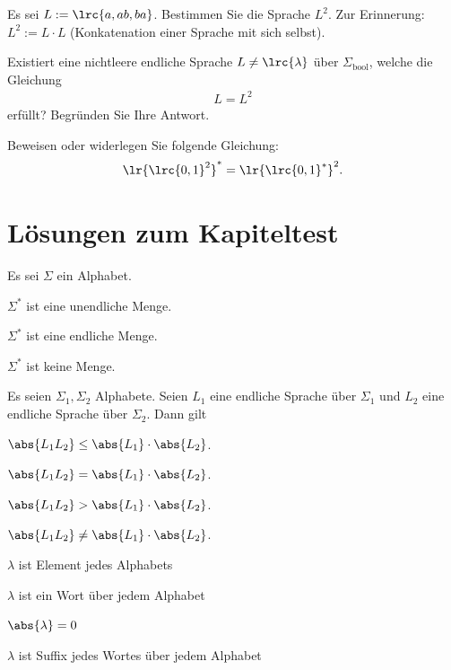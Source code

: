 \begin{myexercise}\label{myexercise:kp02}
	\begin{aenum}
		\item Es sei $L := \lrc{a, ab, ba}$. Bestimmen Sie die Sprache $L^2$. Zur Erinnerung: $L^2 := L\cdot L$ (Konkatenation einer Sprache mit sich selbst).
		\item Existiert eine nichtleere endliche Sprache $L\neq\lrc{\lambda}$ über $\Sigma_{\text{bool}}$, welche die Gleichung
		\begin{align*}
			L = L^2
		\end{align*}
		erfüllt? Begründen Sie Ihre Antwort.
	\end{aenum}
\end{myexercise}

\begin{myexercise}\label{myexercise:kp03}
	Beweisen oder widerlegen Sie folgende Gleichung:
	\begin{align*}
		\lr{\lrc{0, 1}^2}^* = \lr{\lrc{0, 1}^*}^2.
	\end{align*}
\end{myexercise}

\clearpage
\section{Lösungen zum Kapiteltest}
\shipoutAnswer
\begin{myanswer}[myexercise:kp00]
	\begin{aenum}
		\item Es sei $\Sigma$ ein Alphabet.
		\begin{todolist}
			\item[\done] $\Sigma^*$ ist eine unendliche Menge.
			\item $\Sigma^*$ ist eine endliche Menge.
			\item $\Sigma^*$ ist keine Menge.
		\end{todolist}
		\item Es seien $\Sigma_1, \Sigma_2$ Alphabete. Seien $L_1$ eine endliche Sprache über $\Sigma_1$ und $L_2$ eine endliche Sprache über $\Sigma_2$. Dann gilt
		\begin{todolist}
			\item[\done] $\abs{L_1L_2} \leq \abs{L_1}\cdot \abs{L_2}$.
			\item $\abs{L_1L_2} = \abs{L_1}\cdot \abs{L_2}$.
			\item $\abs{L_1L_2} > \abs{L_1}\cdot \abs{L_2}$.
			\item $\abs{L_1L_2} \neq \abs{L_1}\cdot \abs{L_2}$.
		\end{todolist}
		\item
		\begin{todolist}
			\item $\lambda$ ist Element jedes Alphabets
			\item[\done] $\lambda$ ist ein Wort über jedem Alphabet
			\item[\done] $\abs{\lambda} = 0$
			\item[\done] $\lambda$ ist Suffix jedes Wortes über jedem Alphabet
		\end{todolist}
	\end{aenum}
\end{myanswer}

